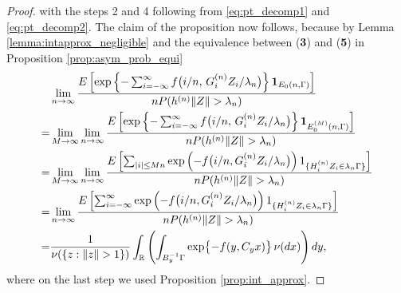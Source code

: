 \documentclass[11pt,reqno]{amsart}
\numberwithin{equation}{section}
\theoremstyle{definition}
\theoremstyle{remark}
\theoremstyle{definition}
\newcommand{\RR}{\mathbb{R}}
\newcommand{\bbr}{\RR}
\newcommand{\one}{{\bf 1}}
\begin{document}
\begin{proof}
with the steps 2 and 4 following from \eqref{eq:pt_decomp1} and
\eqref{eq:pt_decomp2}. The claim of the proposition now follows,
because by Lemma 
\ref{lemma:intapprox_negligible} and the equivalence between ({\bf 3})
and ({\bf 5}) in Proposition \ref{prop:asym_prob_equi}
\begin{align*}
&\lim_{n\to\infty} \frac{E\left[\exp\left\{ -\sum_{i=-\infty}^\infty
  f\big(i/n, \, G_i^{(n)}
  Z_i/\lambda_n\big)\right\} \one_{E_0(n,\Gamma)}\right]}
{n P(h^{(n)}\|Z\|>\lambda_n)}\\
=&\lim_{M\to\infty} \lim_{n\to\infty} \frac{E\left[\exp\left\{ -\sum_{i=-\infty}^\infty
  f\big(i/n, \, G_i^{(n)}
  Z_i/\lambda_n\big)\right\} \one_{E_0^{(M)}(n,\Gamma)}\right]}
{n P(h^{(n)}\|Z\|>\lambda_n)}\\
=&\lim_{M\to\infty} \lim_{n\to\infty} \frac{ E \left[\sum_{|i|\leq Mn}\exp\left(-
      f\bigl(i/n, {G_i^{(n)}} Z_i/\lambda_n\bigr)\right)
    1_{\{{H_i^{(n)}}  Z_i\in \lambda_n\Gamma\}}\right] } {n
    P(h^{(n)}\|Z\|>\lambda_n)} \\
=&\lim_{n\to\infty} \frac{ E \left[\sum_{i=-\infty}^\infty\exp\left(-
      f\bigl(i/n, {G_i^{(n)}} Z_i/\lambda_n\bigr)\right)
    1_{\{{H_i^{(n)}}  Z_i\in \lambda_n\Gamma\}}\right] } {n
    P(h^{(n)}\|Z\|>\lambda_n)} \\
=&\frac{1}{\nu(\{z: \|z\|> 1\})}
\int_\bbr \left( \int_{B_y^{-1}\Gamma} \exp\bigl\{ -f(y,C_yx)\bigr\}\,
              \nu(dx)\right)dy, 
\end{align*}
where on the last step we used Proposition \ref{prop:int_approx}. 
\end{proof}
\end{document}

